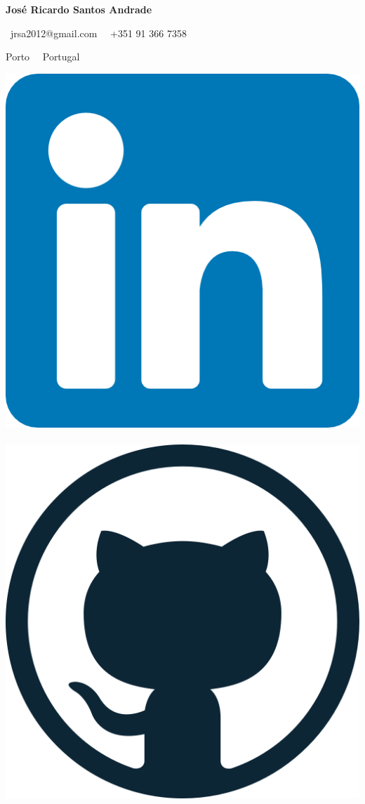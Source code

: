 \documentclass{mycv}
\begin{document}
\begin{center}
	{\LARGE\textbf{José Ricardo Santos Andrade}} \\
	\vspace{0.2cm}	
	
	\ jrsa2012@gmail.com~\textbullet 
	\ +351 91 366 7358
	
	Porto~\textbullet 
	\ Portugal

	
	\vspace{0.4cm}
	
	\href{https://www.linkedin.com/in/jrsa2012}{\includegraphics[scale=0.06]{figs/linkedin_logo.png}}
	\ \ \ \
	\href{https://github.com/jrsa2012}{\includegraphics[scale=0.035]{figs/github_logo.png}}

\end{center}
\end{document}

